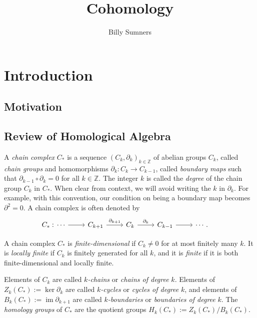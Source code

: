 \documentclass{book}
\title{Cohomology}
\author{Billy Sumners}
\newcommand{\bbZ}{\mathbb{Z}}
\DeclareMathOperator{\im}{im}
\theoremstyle{definition}
\theoremstyle{remark}
\numberwithin{equation}{section}
\begin{document}
\maketitle 

\chapter{Introduction}
\section{Motivation}

\section{Review of Homological Algebra}
A \textit{chain complex} $C_*$ is a sequence $(C_k, \partial_k)_{k \in \bbZ}$ of abelian groups $C_k$, called \textit{chain groups} and homomorphisms $\partial_k \colon C_k \to C_{k-1}$, called \textit{boundary maps} such that $\partial_{k-1} \circ \partial_k = 0$ for all $k \in \bbZ$. The integer $k$ is called the \textit{degree} of the chain group $C_k$ in $C_*$. When clear from context, we will avoid writing the $k$ in $\partial_k$. For example, with this convention, our condition on being a boundary map becomes $\partial^2 = 0$. A chain complex is often denoted by
\begin{equation}
    \begin{aligned}
        C_*: 
        & 
        \begin{tikzcd}
            \cdots \arrow[r] & C_{k+1} \arrow[r,"\partial_{k+1}"] & C_k \arrow[r,"\partial_k"] & C_{k-1} \arrow[r] & \cdots.
        \end{tikzcd} 
        & 
        \hphantom{ }
    \end{aligned} 
\end{equation}

A chain complex $C_*$ is \textit{finite-dimensional} if $C_k \neq 0$ for at most finitely many $k$. It is \textit{locally finite} if $C_k$ is finitely generated for all $k$, and it is \textit{finite} if it is both finite-dimensional and locally finite.

Elements of $C_k$ are called $k$\textit{-chains} or \textit{chains of degree} $k$. Elements of $Z_k(C_*) := \ker{\partial_k}$ are called $k$\textit{-cycles} or \textit{cycles of degree} $k$, and elements of $B_k(C_*) := \im{\partial_{k+1}}$ are called $k$\textit{-boundaries} or \textit{boundaries of degree} $k$. The \textit{homology groups} of $C_*$ are the quotient groups $H_k(C_*) := Z_k(C_*) / B_k(C_*)$.
\end{document}
